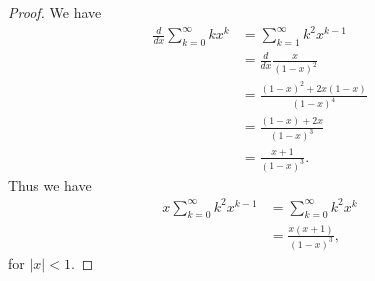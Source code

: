 \begin{proof}
  We have
  \begin{equation*}
    \begin{split}
      \frac{d}{dx} \sum_{k = 0}^\infty k x^k &= \sum_{k = 1}^\infty
      k^2 x^{k - 1} \\
      &= \frac{d}{dx} \frac{x}{{(1 - x)}^2} \\
      &= \frac{{(1 - x)}^2 + 2x(1 - x)}{{(1 - x)}^4} \\
      &= \frac{(1 - x) + 2x}{{(1 - x)}^3} \\
      &= \frac{x + 1}{{(1 - x)}^3}.
    \end{split}
  \end{equation*}
  Thus we have
  \begin{equation*}
    \begin{split}
      x\sum_{k = 0}^\infty k^2 x^{k - 1} &= \sum_{k = 0}^\infty k^2 x^k \\
      &= \frac{x(x + 1)}{{(1 - x)}^3},
    \end{split}
  \end{equation*}
  for $\lvert x \rvert < 1$.
\end{proof}
